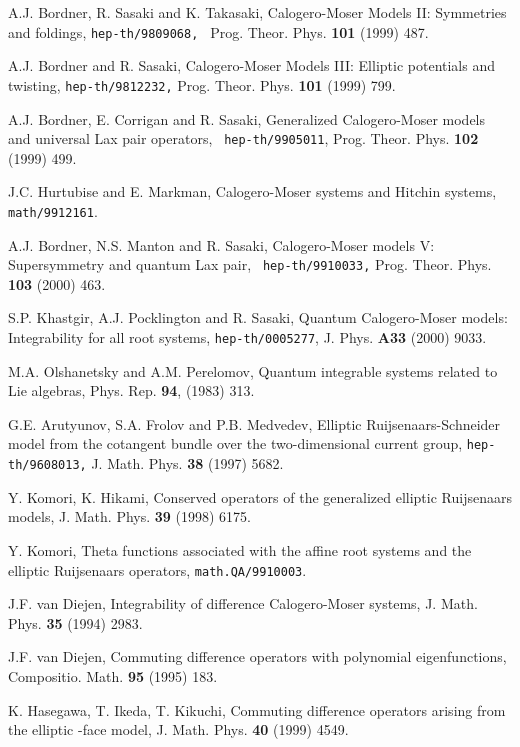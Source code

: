 \documentclass[a4paper,12pt]{article}
\begin{document}
\begin{thebibliography}{99}
	A.J. Bordner, R. Sasaki and K. Takasaki, Calogero-Moser
Models II: Symmetries and foldings, \texttt{hep-th/9809068,
} Prog. Theor. Phys. \textbf{101} (1999) 487.

	A.J. Bordner and R. Sasaki, Calogero-Moser Models III:
Elliptic potentials and twisting, \texttt{hep-th/9812232,} Prog. Theor.
Phys. \textbf{101} (1999) 799.

	A.J. Bordner, E. Corrigan and R. Sasaki,
Generalized Calogero-Moser models and universal Lax pair operators,
\texttt{ hep-th/9905011}, Prog. Theor. Phys. \textbf{102}
(1999) 499.

  J.C. Hurtubise and E. Markman, Calogero-Moser systems and
Hitchin systems, \texttt{math/9912161}.


  A.J. Bordner, N.S. Manton and R. Sasaki,
Calogero-Moser models V: Supersymmetry and quantum Lax pair,
\texttt{ hep-th/9910033,} Prog. Theor. Phys. \textbf{103}
(2000) 463.


 S.P. Khastgir, A.J. Pocklington and R.
Sasaki, Quantum Calogero-Moser models: Integrability for all
root systems, \texttt{hep-th/0005277}, J. Phys. \textbf{A33}
(2000) 9033.


  M.A. Olshanetsky and A.M. Perelomov, Quantum
integrable  systems related to Lie algebras, Phys.
Rep. \textbf{94}, (1983) 313.

  G.E. Arutyunov, S.A. Frolov and P.B. Medvedev, Elliptic
Ruijsenaars-Schneider model from the cotangent bundle over
the two-dimensional current group, \texttt{hep-th/9608013,}
J. Math. Phys. \textbf{38 }(1997) 5682.

  Y. Komori, K. Hikami, Conserved operators of the generalized
elliptic Ruijsenaars models, J. Math. Phys. \textbf{39}
(1998) 6175.

  Y. Komori, Theta functions associated with the affine root
systems and the elliptic Ruijsenaars operators, \texttt{math.QA/9910003}.

  J.F. van Diejen, Integrability of difference Calogero-Moser
systems, J. Math. Phys. \textbf{35} (1994) 2983.

  J.F. van Diejen, Commuting difference operators with
polynomial eigenfunctions, Compositio. Math. \textbf{95}
(1995) 183.

  K. Hasegawa, T. Ikeda, T. Kikuchi, Commuting difference
operators arising from the elliptic \coordHE{}-face
model, J. Math. Phys. \textbf{40} (1999) 4549.



\end{thebibliography}
\end{document}
